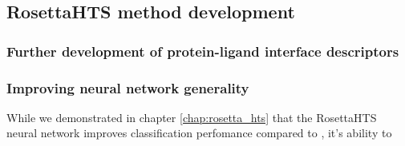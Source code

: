 \subsection{RosettaHTS method development}

\subsubsection{Further development of protein-ligand interface descriptors}

\subsubsection{Improving neural network generality}
While we demonstrated in chapter \ref{chap:rosetta_hts} that the RosettaHTS neural network improves classification perfomance compared to , it's ability to 
